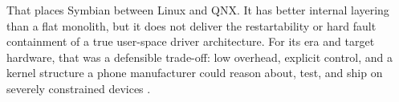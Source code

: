 That places Symbian between Linux and QNX. It has better internal layering
than a flat monolith, but it does not deliver the restartability or hard fault
containment of a true user-space driver architecture. For its era and target
hardware, that was a defensible trade-off: low overhead, explicit control, and
a kernel structure a phone manufacturer could reason about, test, and ship on
severely constrained devices \citep{sales2005, symbian_eka2_kernel}.
